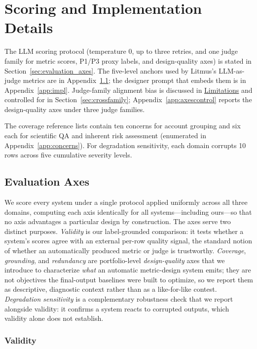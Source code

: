 \documentclass[11pt]{article}
\begin{document}
\section{Scoring and Implementation Details}
\label{sec:scoring_details}
The LLM scoring protocol (temperature 0, up to three retries, and one judge family for metric scores, P1/P3 proxy labels, and design-quality axes) is stated in Section~\ref{sec:evaluation_axes}. The five-level anchors used by Litmus's LLM-as-judge metrics are in Appendix~\ref{app:evaluation_axes}; the designer prompt that embeds them is in Appendix~\ref{app:impl}. Judge-family alignment bias is discussed in \hyperref[sec:limitations]{Limitations} and controlled for in Section~\ref{sec:crossfamily}; Appendix~\ref{app:axescontrol} reports the design-quality axes under three judge families.

The coverage reference lists contain ten concerns for account grouping and six each for scientific QA and inherent risk assessment (enumerated in Appendix~\ref{app:concerns}). For degradation sensitivity, each domain corrupts 10 rows across five cumulative severity levels.

\subsection{Evaluation Axes}
\label{app:evaluation_axes}

We score every system under a single protocol applied uniformly across all three domains, computing each axis identically for all systems---including ours---so that no axis advantages a particular design by construction. The axes serve two distinct purposes. \emph{Validity} is our label-grounded comparison: it tests whether a system's scores agree with an external per-row quality signal, the standard notion of whether an automatically produced metric or judge is trustworthy. \emph{Coverage}, \emph{grounding}, and \emph{redundancy} are portfolio-level \emph{design-quality} axes that we introduce to characterize \emph{what} an automatic metric-design system emits; they are not objectives the final-output baselines were built to optimize, so we report them as descriptive, diagnostic context rather than as a like-for-like contest. \emph{Degradation sensitivity} is a complementary robustness check that we report alongside validity: it confirms a system reacts to corrupted outputs, which validity alone does not establish.

\subsubsection{Validity}
\end{document}
